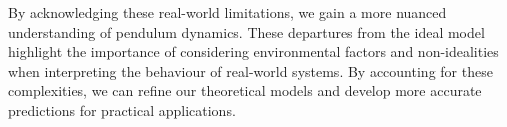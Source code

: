 By acknowledging these real-world limitations, we gain a more nuanced understanding of pendulum dynamics. These departures from the ideal model highlight the importance of considering environmental factors and non-idealities when interpreting the behaviour of real-world systems. By accounting for these complexities, we can refine our theoretical models and develop more accurate predictions for practical applications.
